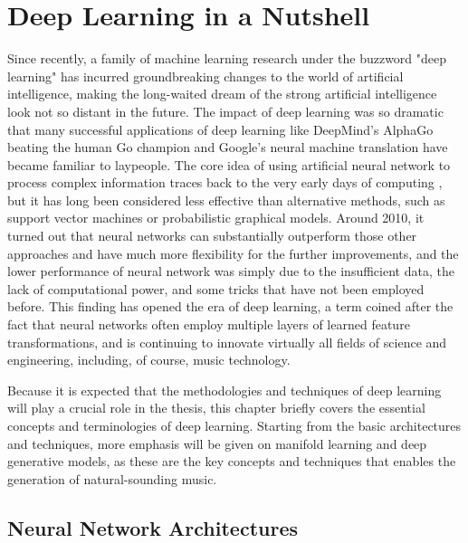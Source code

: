 
\graphicspath{{2-deeplearning/figures/}}

\chapter{Deep Learning in a Nutshell}\label{sec:deeplearning}
\label{ch:deeplearning}

Since recently, a family of machine learning research under the buzzword "deep learning" has incurred groundbreaking changes to the world of artificial intelligence, making the long-waited dream of the strong artificial intelligence look not so distant in the future.
The impact of deep learning was so dramatic that many successful applications of deep learning like DeepMind's AlphaGo beating the human Go champion and Google's neural machine translation have became familiar to laypeople.
The core idea of using artificial neural network to process complex information traces back to the very early days of computing \cite{kleene1951representation}, but it has long been considered less effective than alternative methods, such as support vector machines or probabilistic graphical models.
Around 2010, it turned out that neural networks can substantially outperform those other approaches and have much more flexibility for the further improvements, and the lower performance of neural network was simply due to the insufficient data, the lack of computational power, and some tricks that have not been employed before.
This finding has opened the era of deep learning, a term coined after the fact that neural networks often employ multiple layers of learned feature transformations, and is continuing to innovate virtually all fields of science and engineering, including, of course, music technology.

Because it is expected that the methodologies and techniques of deep learning will play a crucial role in the thesis, this chapter briefly covers the essential concepts and terminologies of deep learning. Starting from the basic architectures and techniques, more emphasis will be given on manifold learning and deep generative models, as these are the key concepts and techniques that enables the generation of natural-sounding music.

\section{Neural Network Architectures}

